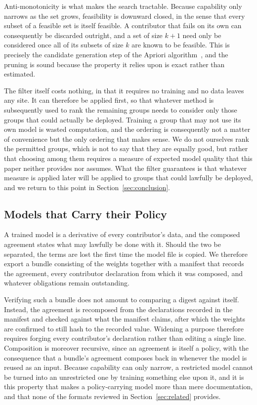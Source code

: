\documentclass[sigconf,anonymous,review]{acmart}
\begin{document}
Anti-monotonicity is what makes the search tractable. Because capability only
narrows as the set grows, feasibility is downward closed, in the sense that every
subset of a feasible set is itself feasible. A contributor that fails on its own
can consequently be discarded outright, and a set of size $k+1$ need only be
considered once all of its subsets of size $k$ are known to be feasible. This is
precisely the candidate generation step of the Apriori algorithm~\cite{apriori},
and the pruning is sound because the property it relies upon is exact rather than
estimated.

The filter itself costs nothing, in that it requires no training and no data
leaves any site. It can therefore be applied first, so that whatever method is
subsequently used to rank the remaining groups needs to consider only those
groups that could actually be deployed. Training a group that may not use its own
model is wasted computation, and the ordering is consequently not a matter of
convenience but the only ordering that makes sense. We do not ourselves rank the
permitted groups, which is not to say that they are equally good, but rather that
choosing among them requires a measure of expected model quality that this paper
neither provides nor assumes. What the filter guarantees is that whatever measure
is applied later will be applied to groups that could lawfully be deployed, and
we return to this point in Section~\ref{sec:conclusion}.

\subsection{Models that Carry their Policy}
\label{sec:bundle}

A trained model is a derivative of every contributor's data, and the composed
agreement states what may lawfully be done with it. Should the two be separated,
the terms are lost the first time the model file is copied. We therefore export a
bundle consisting of the weights together with a manifest that records the
agreement, every contributor declaration from which it was composed, and whatever
obligations remain outstanding.

Verifying such a bundle does not amount to comparing a digest against itself.
Instead, the agreement is recomposed from the declarations recorded in the
manifest and checked against what the manifest claims, after which the weights
are confirmed to still hash to the recorded value. Widening a purpose therefore
requires forging every contributor's declaration rather than editing a single
line. Composition is moreover recursive, since an agreement is itself a policy,
with the consequence that a bundle's agreement composes back in whenever the
model is reused as an input. Because capability can only narrow, a restricted
model cannot be turned into an unrestricted one by training something else upon
it, and it is this property that makes a policy-carrying model more than mere
documentation, and that none of the formats reviewed in
Section~\ref{sec:related} provides.
\end{document}
